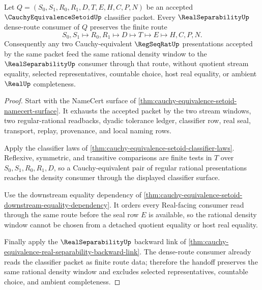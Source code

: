 \begin{theorem}
\label{thm:cauchy-equivalence-setoid-real-separability-stable-density}
Let $Q=(S_0,S_1,R_0,R_1,D,T,E,H,C,P,N)$ be an accepted $\CauchyEquivalenceSetoidUp$ classifier packet. Every $\RealSeparabilityUp$ dense-route consumer of $Q$ preserves the finite route
$$
S_0,S_1 \longmapsto R_0,R_1 \longmapsto D \longmapsto T \longmapsto E \longmapsto H,C,P,N .
$$
Consequently any two Cauchy-equivalent $\RegSeqRatUp$ presentations accepted by the same packet feed the same rational density window to the $\RealSeparabilityUp$ consumer through that route, without quotient stream equality, selected representatives, countable choice, host real equality, or ambient $\RealUp$ completeness.
\end{theorem}
\begin{proof}
Start with the NameCert surface of \autoref{thm:cauchy-equivalence-setoid-namecert-surface}. It exhausts the accepted packet by the two stream windows, two regular-rational readbacks, dyadic tolerance ledger, classifier row, real seal, transport, replay, provenance, and local naming rows.

Apply the classifier laws of \autoref{thm:cauchy-equivalence-setoid-classifier-laws}. Reflexive, symmetric, and transitive comparisons are finite tests in $T$ over $S_0,S_1,R_0,R_1,D$, so a Cauchy-equivalent pair of regular rational presentations reaches the density consumer through the displayed classifier surface.

Use the downstream equality dependency of \autoref{thm:cauchy-equivalence-setoid-downstream-equality-dependency}. It orders every Real-facing consumer read through the same route before the seal row $E$ is available, so the rational density window cannot be chosen from a detached quotient equality or host real equality.

Finally apply the $\RealSeparabilityUp$ backward link of \autoref{thm:cauchy-equivalence-real-separability-backward-link}. The dense-route consumer already reads the classifier packet as finite route data; therefore the handoff preserves the same rational density window and excludes selected representatives, countable choice, and ambient completeness.
\end{proof}

